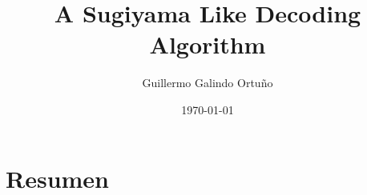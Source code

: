 \documentclass[oneside,openright,titlepage,numbers=noenddot,openany,headinclude,footinclude=true,
cleardoublepage=empty,abstractoff,BCOR=5mm,paper=a4,fontsize=12pt,main=spanish]{scrreprt}
\author{Guillermo Galindo Ortuño}
\date{\today}
\title{A Sugiyama Like Decoding Algorithm}
\begin{document}
\maketitle
\tableofcontents

\chapter*{Resumen}

\cite{turing1936a}







\end{document}
